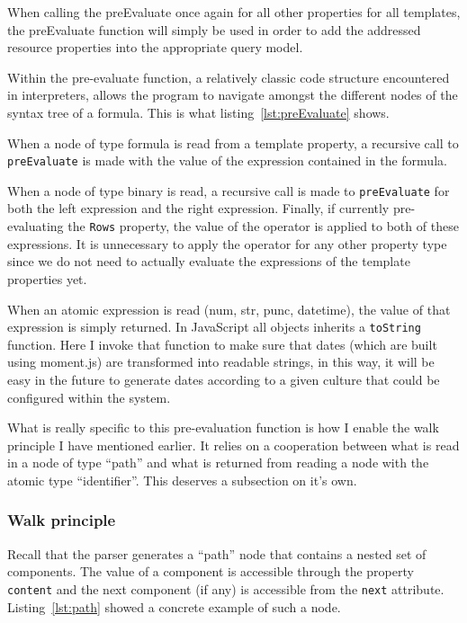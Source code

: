 When calling the preEvaluate once again for all other properties for all templates, the preEvaluate function will simply be used in order to add the addressed resource properties into the appropriate query model.



Within the pre-evaluate function, a relatively classic code structure encountered in interpreters, allows the program to navigate amongst the different nodes of the syntax tree of a formula. This is what listing~\ref{lst:preEvaluate} shows. 

When a node of type formula is read from a template property, a recursive call to \texttt{preEvaluate} is made with the value of the expression contained in the formula. 

When a node of type binary is read, a recursive call is made to \texttt{preEvaluate} for both the left expression and the right expression. Finally, if currently pre-evaluating the \texttt{Rows} property, the value of the operator is applied to both of these expressions. It is unnecessary to apply the operator for any other property type since we do not need to actually evaluate the expressions of the template properties yet.

When an atomic expression is read (num, str, punc, datetime), the value of that expression is simply returned. In JavaScript all objects inherits a \texttt{toString} function. Here I invoke that function to make sure that dates (which are built using moment.js) are transformed into readable strings, in this way, it will be easy in the future to generate dates according to a given culture that could be configured within the system.

What is really specific to this pre-evaluation function is how I enable the walk principle I have mentioned earlier. It relies on a cooperation between what is read in a node of type ``path'' and what is returned from reading a node with the atomic type ``identifier''. This deserves a subsection on it's own.

\subsubsection{Walk principle}

Recall that the parser generates a ``path'' node that contains a nested set of components. The value of a component is accessible through the property \texttt{content} and the next component (if any) is accessible from the \texttt{next} attribute. Listing~\ref{lst:path} showed a concrete example of such a node.

